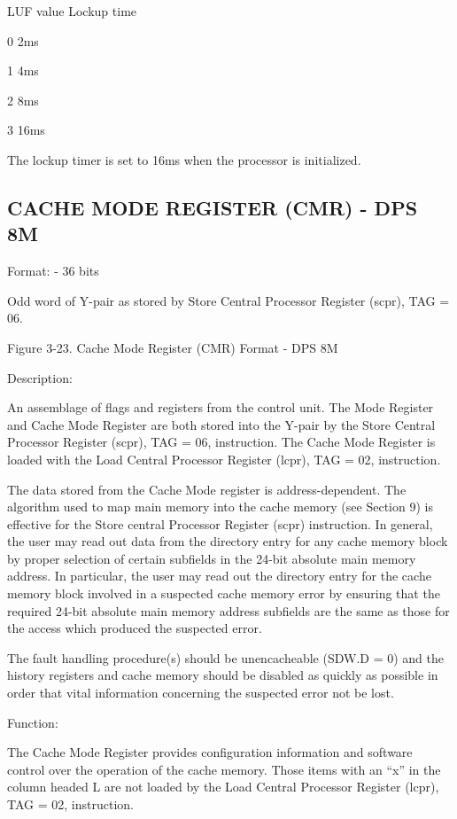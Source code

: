 LUF value Lockup time

0 2ms

1 4ms

2 8ms

3 16ms

The lockup timer is set to 16ms when the processor is initialized.

\subsection{CACHE MODE REGISTER (CMR) - DPS 8M}

Format: - 36 bits

Odd word of Y-pair as stored by Store Central Processor Register (scpr), TAG = 06.

Figure 3-23. Cache Mode Register (CMR) Format - DPS 8M

Description:

An assemblage of flags and registers from the control unit. The Mode Register
and Cache Mode Register are both stored into the Y-pair by the Store Central
Processor Register (scpr), TAG = 06, instruction. The Cache Mode Register is
loaded with the Load Central Processor Register (lcpr), TAG = 02, instruction.

The data stored from the Cache Mode register is address-dependent. The
algorithm used to map main memory into the cache memory (see Section 9) is
effective for the Store central Processor Register (scpr) instruction. In
general, the user may read out data from the directory entry for any cache
memory block by proper selection of certain subfields in the 24-bit absolute
main memory address. In particular, the user may read out the directory entry
for the cache memory block involved in a suspected cache memory error by
ensuring that the required 24-bit absolute main memory address subfields are
the same as those for the access which produced the suspected error.  

The fault handling procedure(s) should be unencacheable (SDW.D = 0) and the
history registers and cache memory should be disabled as quickly as possible in
order that vital information concerning the suspected error not be lost.

Function:

The Cache Mode Register provides configuration information and software control
over the operation of the cache memory. Those items with an {``}x'' in the
column headed L are not loaded by the Load Central Processor Register (lcpr),
TAG = 02, instruction.

